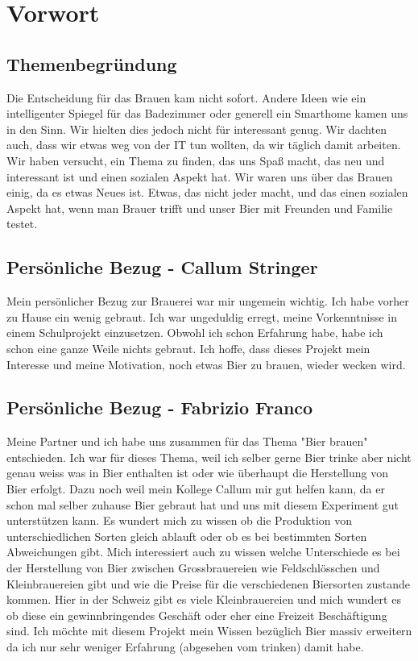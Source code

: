 \newpage
\section{Vorwort}
\subsection{Themenbegründung}
Die Entscheidung für das Brauen kam nicht sofort. Andere Ideen
 wie ein intelligenter Spiegel für das Badezimmer oder generell 
 ein Smarthome kamen uns in den Sinn. Wir hielten dies jedoch nicht
  für interessant genug. Wir dachten auch, dass wir etwas weg von der
   IT tun wollten, da wir täglich damit arbeiten. Wir haben versucht, 
   ein Thema zu finden, das uns Spaß macht, das neu und interessant ist und einen sozialen Aspekt hat.
Wir waren uns über das Brauen einig,
 da es etwas Neues ist. Etwas, das nicht jeder macht, 
 und das einen sozialen Aspekt hat, wenn man Brauer trifft und unser Bier mit Freunden und Familie testet.
\subsection{Persönliche Bezug - Callum Stringer}
Mein persönlicher Bezug zur Brauerei war mir ungemein wichtig. Ich habe vorher zu Hause ein wenig gebraut. 
Ich war ungeduldig erregt, meine Vorkenntnisse in einem Schulprojekt einzusetzen. Obwohl ich schon Erfahrung habe, habe ich schon eine ganze Weile nichts gebraut.
 Ich hoffe, dass dieses Projekt mein Interesse und meine Motivation, noch etwas Bier zu brauen, wieder wecken wird.
 \subsection{Persönliche Bezug - Fabrizio Franco}
 Meine Partner und ich habe uns zusammen für das Thema "Bier brauen" entschieden. Ich war für dieses Thema, weil ich selber
  gerne Bier trinke aber nicht genau weiss was in Bier enthalten ist oder wie überhaupt die Herstellung von Bier erfolgt. 
  Dazu noch weil mein Kollege Callum mir gut helfen kann, da er schon mal selber zuhause Bier gebraut hat und uns mit diesem 
  Experiment gut unterstützen kann. Es wundert mich zu wissen ob die Produktion von unterschiedlichen Sorten gleich ablauft oder 
  ob es bei bestimmten Sorten Abweichungen gibt. Mich interessiert auch zu wissen welche Unterschiede es bei der Herstellung von Bier
   zwischen Grossbrauereien wie Feldschlösschen und Kleinbrauereien gibt und wie die Preise für die verschiedenen Biersorten zustande 
   kommen. Hier in der Schweiz gibt es viele Kleinbrauereien und mich wundert es ob diese ein gewinnbringendes Geschäft oder eher eine
    Freizeit Beschäftigung sind. 
 Ich möchte mit diesem Projekt mein Wissen bezüglich Bier massiv erweitern da ich nur sehr weniger Erfahrung (abgesehen vom trinken) damit habe.
